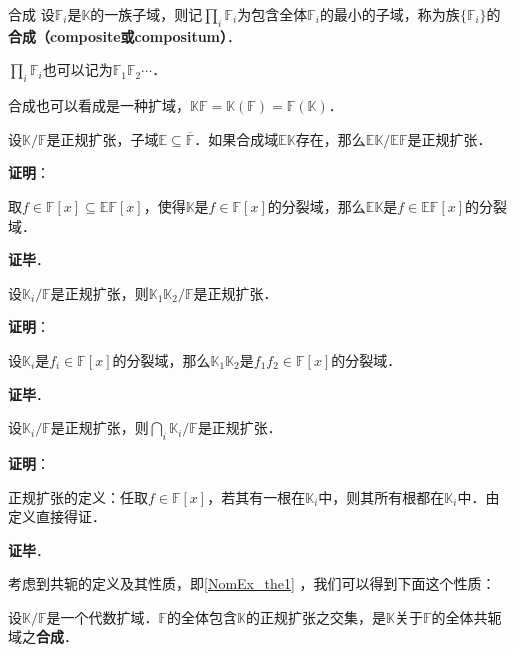 \begin{definition}{合成}
设$\mathbb{F}_i$是$\mathbb{K}$的一族子域，则记$\prod_{i}\mathbb{F}_i$为包含全体$\mathbb{F}_i$的最小的子域，称为族$\{\mathbb{F}_i\}$的\textbf{合成（composite或compositum）}．

$\prod_{i}\mathbb{F}_i$也可以记为$\mathbb{F}_1\mathbb{F}_2\cdots$．
\end{definition}


合成也可以看成是一种扩域，$\mathbb{K}\mathbb{F}=\mathbb{K}(\mathbb{F})=\mathbb{F}(\mathbb{K})$．


\begin{theorem}{}
设$\mathbb{K}/\mathbb{F}$是正规扩张，子域$\mathbb{E}\subseteq\overline{\mathbb{F}}$．如果合成域$\mathbb{EK}$存在，那么$\mathbb{EK}/\mathbb{EF}$是正规扩张．
\end{theorem}

\textbf{证明}：

取$f\in\mathbb{F}[x]\subseteq\mathbb{EF}[x]$，使得$\mathbb{K}$是$f\in\mathbb{F}[x]$的分裂域，那么$\mathbb{EK}$是$f\in\mathbb{EF}[x]$的分裂域．

\textbf{证毕}．






\begin{theorem}{}
设$\mathbb{K}_i/\mathbb{F}$是正规扩张，则$\mathbb{K}_1\mathbb{K}_2/\mathbb{F}$是正规扩张．
\end{theorem}


\textbf{证明}：

设$\mathbb{K}_i$是$f_i\in\mathbb{F}[x]$的分裂域，那么$\mathbb{K}_1\mathbb{K}_2$是$f_1f_2\in\mathbb{F}[x]$的分裂域．

\textbf{证毕}．


\begin{theorem}{}\label{NomEx_the2}
设$\mathbb{K}_i/\mathbb{F}$是正规扩张，则$\bigcap_{i}\mathbb{K}_i/\mathbb{F}$是正规扩张．
\end{theorem}

\textbf{证明}：

正规扩张的定义：任取$f\in\mathbb{F}[x]$，若其有一根在$\mathbb{K}_i$中，则其所有根都在$\mathbb{K}_i$中．由定义直接得证．

\textbf{证毕}．


考虑到共轭的定义及其性质，即\autoref{NomEx_the1} ，我们可以得到下面这个性质：

\begin{theorem}{}\label{NomEx_the3}
设$\mathbb{K}/\mathbb{F}$是一个代数扩域．$\mathbb{F}$的全体包含$\mathbb{K}$的正规扩张之交集，是$\mathbb{K}$关于$\mathbb{F}$的全体共轭域之\textbf{合成}．
\end{theorem}

